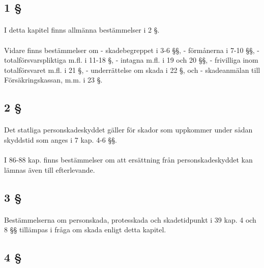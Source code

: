 \documentclass[a4paper,notitlepage,openany,10pt]{book}
\begin{document}
\subsection*{1 §}
\paragraph*{}
I detta kapitel finns allmänna bestämmelser i 2 §.
\paragraph*{}
Vidare finns bestämmelser om
\newline - skadebegreppet i 3-6 §§,
\newline - förmånerna i 7-10 §§,
\newline - totalförsvarspliktiga m.fl. i 11-18 §,
\newline - intagna m.fl. i 19 och 20 §§,
\newline - frivilliga inom totalförsvaret m.fl. i 21 §,
\newline - underrättelse om skada i 22 §, och
\newline - skadeanmälan till Försäkringskassan, m.m. i 23 §.
\subsection*{2 §}
\paragraph*{}
Det statliga personskadeskyddet gäller för skador som uppkommer under sådan skyddstid som anges i 7 kap. 4-6 §§.
\paragraph*{}
I 86-88 kap. finns bestämmelser om att ersättning från personskadeskyddet kan lämnas även till efterlevande.
\subsection*{3 §}
\paragraph*{}
Bestämmelserna om personskada, protesskada och skadetidpunkt i 39 kap. 4 och 8 §§ tillämpas i fråga om skada enligt detta kapitel.
\subsection*{4 §}
\end{document}
